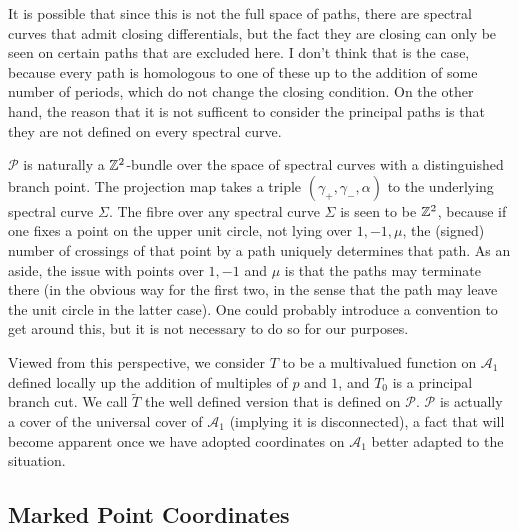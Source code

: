  It is possible that since this is not the full space of paths, there are spectral curves that admit closing differentials, but the fact they are closing can only be seen on certain paths that are excluded here. I don't think that is the case, because every path is homologous to one of these up to the addition of some number of periods, which do not change the closing condition. On the other hand, the reason that it is not sufficent to consider the principal paths is that they are not defined on every spectral curve.

$\mathcal{P}$ is naturally a $\mathbb{Z}^2$-bundle over the space of spectral curves with a distinguished branch point. The projection map takes a triple $(γ_+, γ_-, α)$ to the underlying spectral curve $Σ$. The fibre over any spectral curve $Σ$ is seen to be $\mathbb{Z}^2$, because if one fixes a point on the upper unit circle, not lying over $1,-1,μ$, the (signed) number of crossings of that point by a path uniquely determines that path. As an aside, the issue with points over $1,-1$ and $μ$ is that the paths may terminate there (in the obvious way for the first two, in the sense that the path may leave the unit circle in the latter case). One could probably introduce a convention to get around this, but it is not necessary to do so for our purposes.

Viewed from this perspective, we consider $T$ to be a multivalued function on $\mathcal{A}_1$ defined locally up the addition of multiples of $p$ and $1$, and $T_0$ is a principal branch cut. We call $\tilde{T}$ the well defined version that is defined on $\mathcal{P}$. $\mathcal{P}$ is actually a cover of the universal cover of $\mathcal{A}_1$ (implying it is disconnected), a fact that will become apparent once we have adopted coordinates on $\mathcal{A}_1$ better adapted to the situation.







\subsection{Marked Point Coordinates}
\label{sub:Reformulate}

